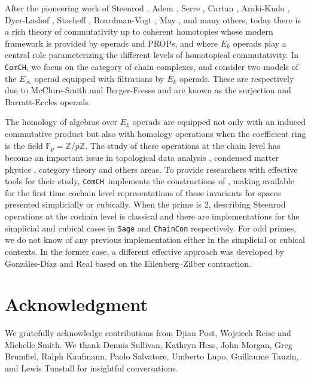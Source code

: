 \documentclass{amsart}
\newcommand{\comch}{\texttt{ComCH}}
\begin{document}
After the pioneering work of Steenrod \cite{Steenrod47, Steenrod62}, Adem \cite{Adem52}, Serre \cite{Serre53}, Cartan \cite{Cartan55}, Araki-Kudo \cite{ArakiKudo56}, Dyer-Lashof \cite{DyerLashof62}, Stasheff \cite{Stasheff63}, Boardman-Vogt \cite{BoardmanVogt73}, May \cite{May70algebraic, May72geometry}, and many others, today there is a rich theory of commutativity up to coherent homotopies whose modern framework is provided by operads and PROPs, and where $E_k$ operads play a central role parameterizing the different levels of homotopical commutativity.
In \comch, we focus on the category of chain complexes, and consider two models of the $E_\infty$ operad equipped with filtrations by $E_k$ operads.
These are respectively due to McClure-Smith \cite{McClureSmith03} and Berger-Fresse \cite{BergerFresse04} and are known as the surjection and Barratt-Eccles operads.

The homology of algebras over $E_k$ operads are equipped not only with an induced commutative product but also with homology operations when the coefficient ring is the field $\mathbb F_p = \mathbb Z/ p\mathbb Z$.
The study of these operations at the chain level has become an important issue in topological data analysis \cite{medina2018persistence}, condensed matter physics \cite{Kapustin2017}, category theory \cite{medina2020globular} and others areas.
To provide researchers with effective tools for their study, \comch\, implements the constructions of \cite{medina2020maysteenrod}, making available for the first time cochain level representations of these invariants for spaces presented simplicially or cubically.
When the prime is $2$, describing Steenrod operations at the cochain level is classical and there are implementations for the simplicial \cite{GonReal1999} and cubical \cite{Pilarczyk2016} cases in \texttt{Sage} \cite{sage} and \texttt{ChainCon} \cite{chaincon} respectively.
For odd primes, we do not know of any previous implementation either in the simplicial or cubical contexts.
In the former case, a different effective approach was developed by Gonz\'ales-D\'iaz and Real \cite{GonReal2003, GonReal2005} based on the Eilenberg–Zilber contraction.

\section*{Acknowledgment}
We gratefully acknowledge contributions from Djian Post, Wojciech Reise and Michelle Smith.
We thank Dennis Sullivan, Kathryn Hess, John Morgan, Greg Brumfiel, Ralph Kaufmann, Paolo Salvatore, Umberto Lupo, Guillaume Tauzin, and Lewis Tunstall for insightful conversations.
\end{document}
